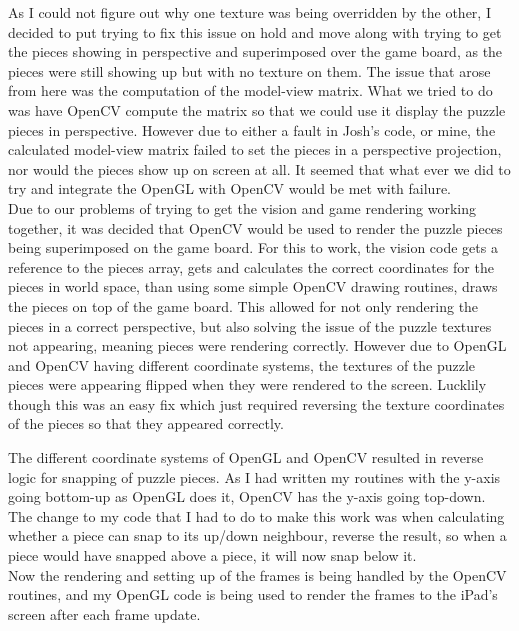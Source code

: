 \documentclass{article}
\begin{document}
As I could not figure out why one texture was being overridden by the other, I
decided to put trying to fix this issue on hold and move along with trying to
get the pieces showing in perspective and superimposed over the game board, as
the pieces were still showing up but with no texture on them. The issue that
arose from here was the computation of the model-view matrix. What we tried to
do was have OpenCV compute the matrix so that we could use it display the puzzle
pieces in perspective. However due to either a fault in Josh's code, or mine,
the calculated model-view matrix failed to set the pieces in a perspective
projection, nor would the pieces show up on screen at all. It seemed that what
ever we did to try and integrate the OpenGL with OpenCV would be met with
failure.\\

Due to our problems of trying to get the vision and game rendering working
together, it was decided that OpenCV would be used to render the puzzle pieces
being superimposed on the game board. For this to work, the vision code gets a
reference to the pieces array, gets and calculates the correct coordinates for
the pieces in world space, than using some simple OpenCV drawing routines, draws
the pieces on top of the game board. This allowed for not only rendering the
pieces in a correct perspective, but also solving the issue of the puzzle
textures not appearing, meaning pieces were rendering correctly. However due to
OpenGL and OpenCV having different coordinate systems, the textures of the
puzzle pieces were appearing flipped when they were rendered to the screen.
Lucklily though this was an easy fix which just required reversing the texture
coordinates of the pieces so that they appeared correctly.\\
\fi

The different coordinate systems of OpenGL and OpenCV resulted in reverse logic
for snapping of puzzle pieces. As I had written my routines with the y-axis
going bottom-up as OpenGL does it, OpenCV has the y-axis going top-down. The
change to my code that I had to do to make this work was when calculating
whether a piece can snap to its up/down neighbour, reverse the result, so when a
piece would have snapped above a piece, it will now snap below it.\\

Now the rendering and setting up of the frames is being handled by the OpenCV
routines, and my OpenGL code is being used to render the frames to the iPad's
screen after each frame update. 
\end{document}
